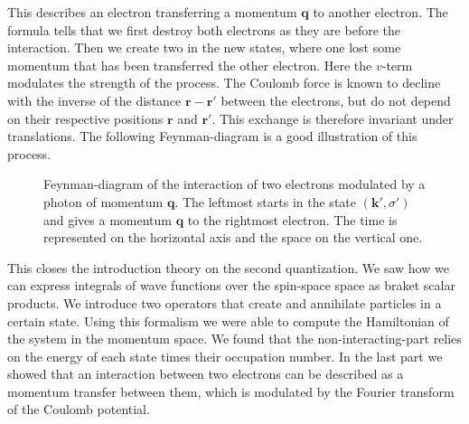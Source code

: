 \documentclass[../main.tex]{subfile}
\begin{document}
This describes an electron transferring a momentum $\bm{q}$ to another electron. The formula tells that we first destroy both electrons as they are before the interaction.
Then we create two in the new states, where one lost some momentum that has been transferred the other electron. Here the $v$-term modulates the strength of the process. 
The Coulomb force is known to decline with the inverse of the distance $\bm{r}-\bm{r}'$
between the electrons, but do not depend on their respective positions $\bm{r}$ and $\bm{r}'$. This exchange is therefore invariant under translations.
The following Feynman-diagram is a good illustration of this process.\\
\begin{figure}[H]
    \centering

    \caption{Feynman-diagram of the interaction of two electrons modulated by a photon of momentum $\bm{q}$. The leftmost starts in the state  $(\bm{k}', \sigma')$ and gives 
    a momentum $\bm{q}$ to the rightmost electron. The time is represented on the horizontal axis and the space on the vertical one.}
    \label{fig:photon_exchange}
\end{figure}
This closes the introduction theory on the second quantization. We saw how we can express integrals of wave functions over the spin-space space as braket scalar products. 
We introduce two operators that create and annihilate particles in a certain state. Using this formalism we were able to compute the 
Hamiltonian of the system in the momentum space. We found that the non-interacting-part relies on the energy of each state times their occupation number.
In the last part we showed that an interaction between two electrons can be described as a momentum transfer between them,
 which is modulated by the Fourier transform of the Coulomb potential.\\
\end{document}
